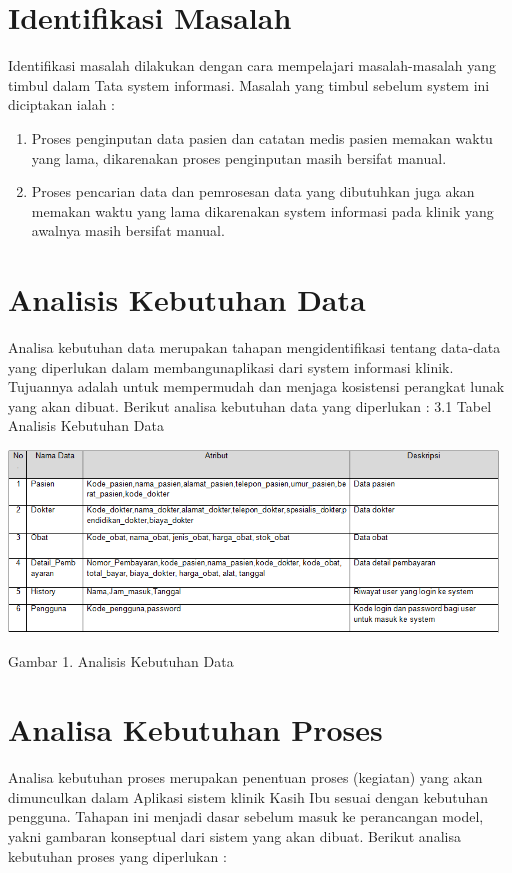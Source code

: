 \documentclass{jtetiproposalskripsi}
\begin{document}
\section{Identifikasi Masalah}
Identifikasi masalah dilakukan dengan cara mempelajari masalah-masalah yang timbul dalam Tata system informasi. Masalah yang timbul sebelum system ini diciptakan ialah : 
\begin{enumerate}
\item Proses penginputan data pasien dan catatan medis pasien memakan waktu yang lama, dikarenakan proses penginputan masih bersifat manual. 
\item Proses pencarian data dan pemrosesan data yang dibutuhkan juga akan memakan waktu yang lama dikarenakan system informasi pada klinik yang awalnya masih bersifat manual.
\end{enumerate}

\section{Analisis Kebutuhan Data}
Analisa kebutuhan data merupakan tahapan mengidentifikasi tentang data-data yang diperlukan dalam membangunaplikasi dari system informasi klinik. Tujuannya adalah untuk mempermudah dan menjaga kosistensi perangkat lunak yang akan dibuat. Berikut analisa kebutuhan data yang diperlukan :
3.1 Tabel Analisis Kebutuhan Data

\begin{center}
\includegraphics[width=13cm]{gambar/KebutuhanData.png} 

Gambar 1. Analisis Kebutuhan Data
\end{center}


\section{Analisa Kebutuhan Proses}
Analisa kebutuhan proses merupakan penentuan proses (kegiatan) yang akan dimunculkan dalam Aplikasi sistem klinik Kasih Ibu sesuai dengan kebutuhan pengguna. Tahapan ini menjadi dasar sebelum masuk ke perancangan model, yakni gambaran konseptual dari sistem yang akan dibuat. Berikut analisa kebutuhan proses yang diperlukan :
\end{document}
